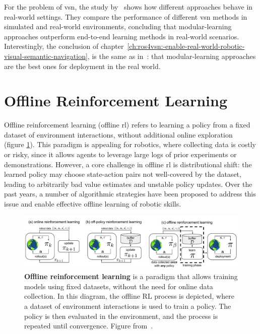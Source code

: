 For the problem of \acrshort{vsn}, the study by~\cite{gervet2022} shows how different approaches behave in real-world settings.
They compare the performance of different \acrshort{vsn} methods in simulated and real-world environments, concluding that modular-learning approaches outperform end-to-end learning methods in real-world scenarios.
Interestingly, the conclusion of chapter~\ref{ch:ros4vsn:-enable-real-world-robotic-visual-semantic-navigation}, is the same as in~\cite{gervet2022}: that modular-learning approaches are the best ones for deployment in the real world.

\section{Offline Reinforcement Learning}\label{sec:offline-reinforcement-learning}

Offline reinforcement learning (offline \acrshort{rl}) refers to learning a policy from a fixed dataset of environment interactions, without additional online exploration~\cite{levine2020} (figure \ref{fig:diagram-offline}).
This paradigm is appealing for robotics, where collecting data is costly or risky, since it allows agents to leverage large logs of prior experiments or demonstrations.
However, a core challenge in offline \acrshort{rl} is distributional shift: the learned policy may choose state-action pairs not well-covered by the dataset, leading to arbitrarily bad value estimates and unstable policy updates.
Over the past years, a number of algorithmic strategies have been proposed to address this issue and enable effective offline learning of robotic skills.

\begin{figure}
    \includegraphics[width=\textwidth]{figures/related_work/diagram_offline}
    \caption{\textbf{Offline reinforcement learning} is a paradigm that allows training models using fixed datasets, without the need for online data collection.
    In this diagram, the offline RL process is depicted, where a dataset of environment interactions is used to train a policy.
    The policy is then evaluated in the environment, and the process is repeated until convergence.
    Figure from~\cite{levine2020}.}
    \label{fig:diagram-offline}
\end{figure}

